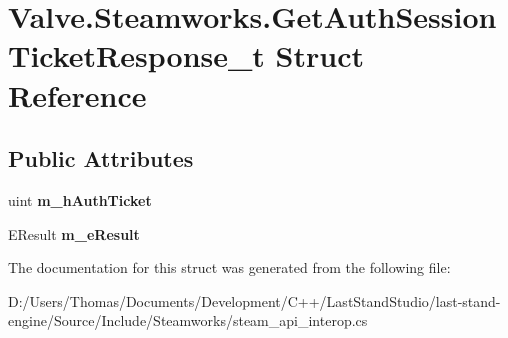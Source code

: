 \hypertarget{structValve_1_1Steamworks_1_1GetAuthSessionTicketResponse__t}{}\section{Valve.\+Steamworks.\+Get\+Auth\+Session\+Ticket\+Response\+\_\+t Struct Reference}
\label{structValve_1_1Steamworks_1_1GetAuthSessionTicketResponse__t}
\subsection*{Public Attributes}
\begin{DoxyCompactItemize}
\item 
\hypertarget{structValve_1_1Steamworks_1_1GetAuthSessionTicketResponse__t_a683435af367a9766bf5e0990ae5b9ab6}{}uint {\bfseries m\+\_\+h\+Auth\+Ticket}\label{structValve_1_1Steamworks_1_1GetAuthSessionTicketResponse__t_a683435af367a9766bf5e0990ae5b9ab6}

\item 
\hypertarget{structValve_1_1Steamworks_1_1GetAuthSessionTicketResponse__t_ad0695f539af4a2ca04c7fcd640c6e047}{}E\+Result {\bfseries m\+\_\+e\+Result}\label{structValve_1_1Steamworks_1_1GetAuthSessionTicketResponse__t_ad0695f539af4a2ca04c7fcd640c6e047}

\end{DoxyCompactItemize}


The documentation for this struct was generated from the following file\+:\begin{DoxyCompactItemize}
\item 
D\+:/\+Users/\+Thomas/\+Documents/\+Development/\+C++/\+Last\+Stand\+Studio/last-\/stand-\/engine/\+Source/\+Include/\+Steamworks/steam\+\_\+api\+\_\+interop.\+cs\end{DoxyCompactItemize}
